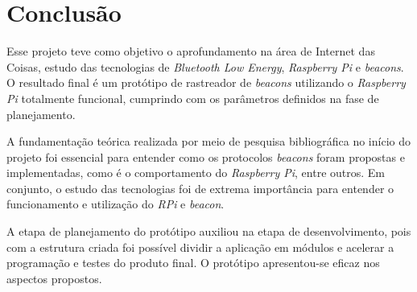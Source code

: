 \documentclass[
		12pt,				%
		openright,			%
		oneside,			%
		a4paper,			%
		chapter=TITLE,		%
		english,			%
		brazil				%
	]{abntex2}
\begin{document}










\chapter{Conclusão}

Esse projeto teve como objetivo o aprofundamento na área de Internet das Coisas, estudo das tecnologias de \textit{Bluetooth Low Energy}, \textit{Raspberry Pi} e \textit{beacons}. O resultado final é um protótipo de rastreador de \textit{beacons} utilizando o \textit{Raspberry Pi} totalmente funcional, cumprindo com os parâmetros definidos na fase de planejamento.

A fundamentação teórica realizada por meio de pesquisa bibliográfica no início do projeto foi essencial para entender como os protocolos \textit{beacons} foram propostas e implementadas, como é o comportamento do \textit{Raspberry Pi}, entre outros. Em conjunto, o estudo das tecnologias foi de extrema importância para entender o funcionamento e utilização do \textit{RPi} e \textit{beacon}.

A etapa de planejamento do protótipo auxiliou na etapa de desenvolvimento, pois com a estrutura criada foi possível dividir a aplicação em módulos e acelerar a programação e testes do produto final. O protótipo apresentou-se eficaz nos aspectos propostos. 


\end{document}
